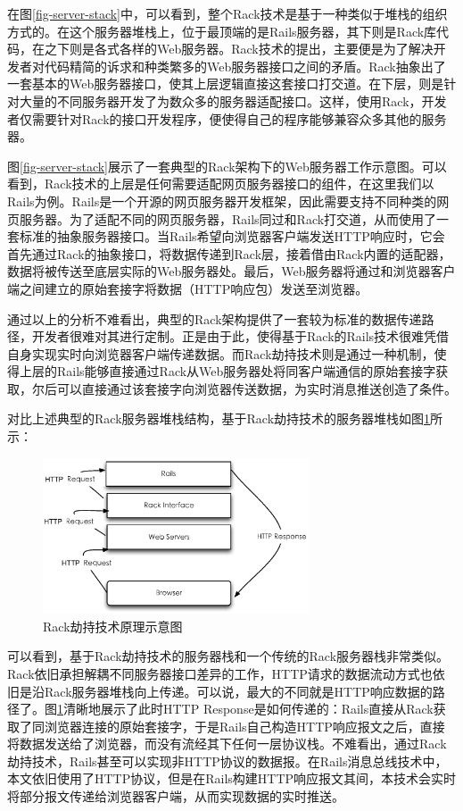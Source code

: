 在图\ref{fig-server-stack}中，可以看到，整个Rack技术是基于一种类似于堆栈的组织方式的。在这个服务器堆栈上，位于最顶端的是Rails服务器，其下则是Rack库代码，在之下则是各式各样的Web服务器。Rack技术的提出，主要便是为了解决开发者对代码精简的诉求和种类繁多的Web服务器接口之间的矛盾。Rack抽象出了一套基本的Web服务器接口，使其上层逻辑直接这套接口打交道。在下层，则是针对大量的不同服务器开发了为数众多的服务器适配接口。这样，使用Rack，开发者仅需要针对Rack的接口开发程序，便使得自己的程序能够兼容众多其他的服务器。

图\ref{fig-server-stack}展示了一套典型的Rack架构下的Web服务器工作示意图。可以看到，Rack技术的上层是任何需要适配网页服务器接口的组件，在这里我们以Rails为例。Rails是一个开源的网页服务器开发框架，因此需要支持不同种类的网页服务器。为了适配不同的网页服务器，Rails同过和Rack打交道，从而使用了一套标准的抽象服务器接口。当Rails希望向浏览器客户端发送HTTP响应时，它会首先通过Rack的抽象接口，将数据传递到Rack层，接着借由Rack内置的适配器，数据将被传送至底层实际的Web服务器处。最后，Web服务器将通过和浏览器客户端之间建立的原始套接字将数据（HTTP响应包）发送至浏览器。

通过以上的分析不难看出，典型的Rack架构提供了一套较为标准的数据传递路径，开发者很难对其进行定制。正是由于此，使得基于Rack的Rails技术很难凭借自身实现实时向浏览器客户端传递数据。而Rack劫持技术则是通过一种机制，使得上层的Rails能够直接通过Rack从Web服务器处将同客户端通信的原始套接字获取，尔后可以直接通过该套接字向浏览器传送数据，为实时消息推送创造了条件。

对比上述典型的Rack服务器堆栈结构，基于Rack劫持技术的服务器堆栈如图\ref{fig-rack-hijack}所示：

\begin{figure}[h]
\centering
\includegraphics[width=0.7\textwidth]{images/overview/rack_hijack.eps}
\caption{Rack劫持技术原理示意图}
\label{fig-rack-hijack}
\end{figure}

可以看到，基于Rack劫持技术的服务器栈和一个传统的Rack服务器栈非常类似。Rack依旧承担解耦不同服务器接口差异的工作，HTTP请求的数据流动方式也依旧是沿Rack服务器堆栈向上传递。可以说，最大的不同就是HTTP响应数据的路径了。图\ref{fig-rack-hijack}清晰地展示了此时HTTP Response是如何传递的：Rails直接从Rack获取了同浏览器连接的原始套接字，于是Rails自己构造HTTP响应报文之后，直接将数据发送给了浏览器，而没有流经其下任何一层协议栈。不难看出，通过Rack劫持技术，Rails甚至可以实现非HTTP协议的数据报。在Rails消息总线技术中，本文依旧使用了HTTP协议，但是在Rails构建HTTP响应报文其间，本技术会实时将部分报文传递给浏览器客户端，从而实现数据的实时推送。


